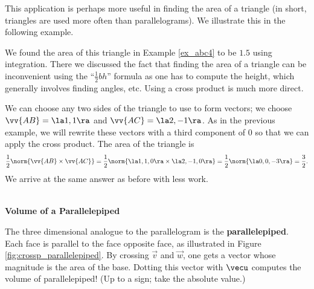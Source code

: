 This application is perhaps more useful in finding the area of a triangle (in short, triangles are used more often than parallelograms). We illustrate this in the following example.\\

{We found the area of this triangle in Example \ref{ex_abc4} to be $1.5$ using integration. There we discussed the fact that finding the area of a triangle can be inconvenient using the ``$\frac12bh$'' formula as one has to compute the height, which generally involves finding angles, etc. Using a cross product is much more direct.

We can choose any two sides of the triangle to use to form vectors; we choose $\vv{AB} = \la 1,1\ra$ and $\vv{AC}=\la 2,-1\ra$. As in the previous example, we will rewrite these vectors with a third component of 0 so that we can apply the cross product. The area of the triangle is
$$\frac12\norm{\vv{AB}\times\vv{AC}} = \frac12\norm{\la 1,1,0\ra \times \la 2,-1,0\ra} = \frac12\norm{\la 0,0,-3\ra} = \frac32.$$
We arrive at the same answer as before with less work.
}\\

\noindent\textbf{Volume of a Parallelepiped}

The three dimensional analogue to the parallelogram is the \textbf{parallelepiped}. Each face is parallel to the face opposite face, as illustrated in Figure \ref{fig:crossp_parallelepiped}. By crossing $\vec v$ and $\vec w$, one gets a vector whose magnitude is the area of the base. Dotting this vector with $\vecu$ computes the volume of parallelepiped! (Up to a sign; take the absolute value.)

